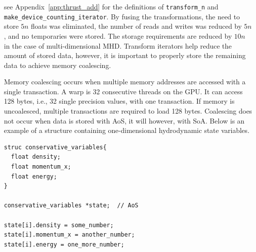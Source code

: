 see Appendix~\ref{app:thrust_add} for the definitions of \verb+transform_n+ and \verb+make_device_counting_iterator+.  By fusing the transformations, the need to store $5n$ floats was eliminated, the number of reads and writes was reduced by $5n$, and no temporaries were stored.  The storage requirements are reduced by $10n$ in the case of multi-dimensional MHD.  Transform iterators help reduce the amount of stored data, however, it is important to properly store the remaining data to achieve memory coalescing.

Memory coalescing occurs when multiple memory addresses are accessed with a single transaction.  A warp is 32 consecutive threads on the GPU.  It can access 128 bytes, i.e., 32 single precision values, with one transaction.  If memory is uncoalesced, multiple transactions are required to load 128 bytes.  Coalescing does not occur when data is stored with AoS, it will however, with SoA.  Below is an example of a structure containing one-dimensional hydrodynamic state variables.
\begin{lstlisting}
struc conservative_variables{
  float density;
  float momentum_x;
  float energy;
}

conservative_variables *state;  // AoS

state[i].density = some_number;
state[i].momentum_x = another_number;
state[i].energy = one_more_number;
\end{lstlisting} 

